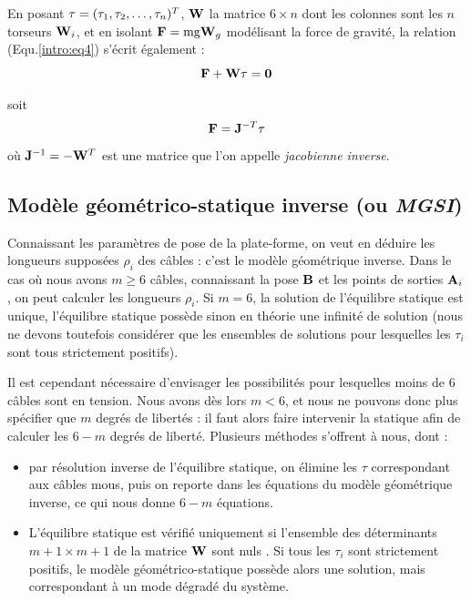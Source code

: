 En posant ${\bf \tau} = (\tau_1, \tau_2, \dots, \tau_n)^T$, ${\bf W}$ la 
matrice 
$6 \times n$ dont les colonnes sont les $n$ torseurs ${\bf W}_i$, et en isolant 
$\mathcal {\bf F} =  \hbox{mg} {\bf W}_g$ modélisant la force de gravité, la 
relation (Equ.\ref{intro:eq4}) s'écrit également :
\begin{equation}
\mathcal {\bf F} + {\bf W} \tau = {\bf 0}
\label{intro:eq5a}
\end{equation}

soit  
\begin{equation}
\mathcal {\bf F} = {\bf J}^{-T} {\bf \tau}
\label{intro:eq5b}
\end{equation}
où ${\bf J}^{-1} = - {\bf W}^T$ est une matrice que l'on appelle {\it 
jacobienne 
inverse}.

\subsection{Modèle géométrico-statique inverse (ou {\it MGSI})} 
\label{chap0-1-3}


Connaissant les paramètres de pose de la plate-forme, on veut en déduire les 
longueurs supposées $\rho_i$ des câbles : c'est le modèle géométrique inverse. 
Dans le cas où nous avons $m \geq 6$ câbles, connaissant la pose 
${\bf B}$ et les points de sorties ${\bf A}_i$, on peut calculer les longueurs 
$\rho_i$. Si $m = 6$, la solution de l'équilibre statique est unique, 
l'\'equilibre statique possède sinon en théorie une infinité de solution (nous 
ne devons toutefois consid\'erer que les ensembles de solutions pour lesquelles 
les $\tau_i$ sont tous strictement positifs).

Il est cependant n\'ecessaire d'envisager les possibilit\'es pour lesquelles 
moins de $6$ c\^ables sont en tension. Nous avons d\`es lors $m < 6$, et nous 
ne pouvons donc plus sp\'ecifier que $m$ degr\'es de libert\'es : il faut alors 
faire intervenir la statique afin de calculer les $6-m$ degr\'es de libert\'e. 
Plusieurs m\'ethodes s'offrent \`a nous, dont :
\begin{itemize}
 \item par r\'esolution inverse de l'\'equilibre statique, on \'elimine les 
$\tau$ correspondant aux c\^ables mous, puis on reporte dans les \'equations du 
mod\`ele g\'eom\'etrique inverse, ce qui nous donne $6-m$ \'equations.
\item L'équilibre statique est vérifié 
uniquement si l'ensemble des déterminants $m+1 \times m+1$ de la matrice ${\bf 
W}$ sont nuls \cite{carricato_merlet2013}. Si tous les $\tau_i$ sont 
strictement positifs, le modèle géométrico-statique possède alors une solution, 
mais correspondant à un mode dégradé du système.
\end{itemize}


